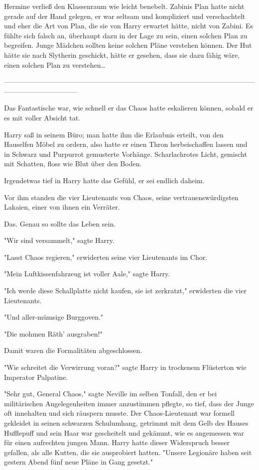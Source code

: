 {Hermine verließ den Klassenraum wie leicht benebelt. Zabinis Plan hatte nicht gerade auf der Hand gelegen, er war seltsam und kompliziert und verschachtelt und eher die Art von Plan, die sie von Harry erwartet hätte, nicht von Zabini. Es fühlte sich falsch an, überhaupt dazu in der Lage zu sein, einen solchen Plan zu begreifen. Junge Mädchen sollten keine solchen Pläne verstehen können. Der Hut hätte sie nach Slytherin geschickt, hätte er gesehen, dass sie dazu fähig wäre, einen solchen Plan zu verstehen…

--------------------------------------------------------------------------------------------------------------------------------------------

Das Fantastische war, wie schnell er das Chaos hatte eskalieren können, sobald er es mit voller Absicht tat.

Harry saß in seinem Büro; man hatte ihm die Erlaubnis erteilt, von den Hauselfen Möbel zu ordern, also hatte er einen Thron herbeischaffen lassen und in Schwarz und Purpurrot gemusterte Vorhänge. Scharlachrotes Licht, gemischt mit Schatten, floss wie Blut über den Boden.

Irgendetwas tief in Harry hatte das Gefühl, er sei endlich daheim.

Vor ihm standen die vier Lieutenants von Chaos, seine vertrauenswürdigsten Lakaien, einer von ihnen ein Verräter.

Das. Genau so sollte das Leben sein.

"Wir sind versammelt," sagte Harry.

"Lasst Chaos regieren," erwiderten seine vier Lieutenants im Chor.

"Mein Luftkissenfahrzeug ist voller Aale," sagte Harry.

"Ich werde diese Schallplatte nicht kaufen, sie ist zerkratzt," erwiderten die vier Lieutenants.

"Und aller-mümsige Burggoven."

"Die mohmen Räth' ausgraben!"

Damit waren die Formalitäten abgeschlossen.

"Wie schreitet die Verwirrung voran?" sagte Harry in trockenem Flüsterton wie Imperator Palpatine.

"Sehr gut, General Chaos," sagte Neville im selben Tonfall, den er bei militärischen Angelegenheiten immer anzustimmen pflegte, so tief, dass der Junge oft innehalten und sich räuspern musste. Der Chaos-Lieutenant war formell gekleidet in seinen schwarzen Schulumhang, getrimmt mit dem Gelb des Hauses Hufflepuff und sein Haar war gescheitelt und gekämmt, wie es angemessen war für einen aufrechten jungen Mann. Harry hatte dieser Widerspruch besser gefallen, als alle Kutten, die sie ausprobiert hatten. "Unsere Legionäre haben seit gestern Abend fünf neue Pläne in Gang gesetzt."

}
